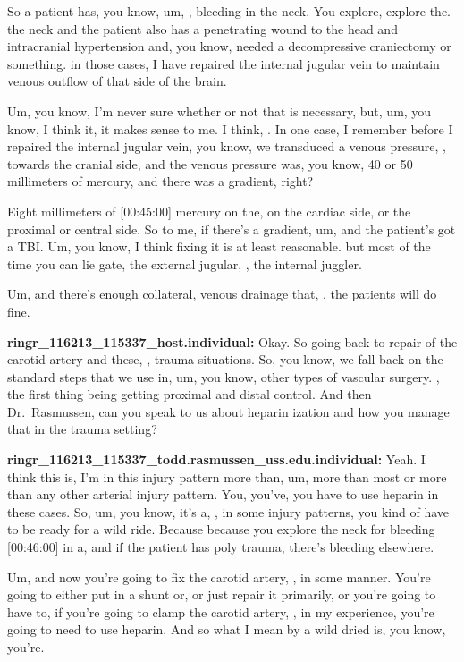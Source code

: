 \documentclass[
]{book}
\begin{document}
So a patient has, you know, um, , bleeding in the neck. You explore,
explore the. the neck and the patient also has a penetrating wound to
the head and intracranial hypertension and, you know, needed a
decompressive craniectomy or something. in those cases, I have repaired
the internal jugular vein to maintain venous outflow of that side of the
brain.

Um, you know, I'm never sure whether or not that is necessary, but, um,
you know, I think it, it makes sense to me. I think, . In one case, I
remember before I repaired the internal jugular vein, you know, we
transduced a venous pressure, , towards the cranial side, and the venous
pressure was, you know, 40 or 50 millimeters of mercury, and there was a
gradient, right?

Eight millimeters of {[}00:45:00{]} mercury on the, on the cardiac side, or
the proximal or central side. So to me, if there's a gradient, um, and
the patient's got a TBI. Um, you know, I think fixing it is at least
reasonable. but most of the time you can lie gate, the external jugular,
, the internal juggler.

Um, and there's enough collateral, venous drainage that, , the patients
will do fine.

\textbf{ringr\_116213\_115337\_host.individual:} Okay. So going back to repair
of the carotid artery and these, , trauma situations. So, you know, we
fall back on the standard steps that we use in, um, you know, other
types of vascular surgery. , the first thing being getting proximal and
distal control. And then Dr.~Rasmussen, can you speak to us about
heparin ization and how you manage that in the trauma setting?

\textbf{ringr\_116213\_115337\_todd.rasmussen\_uss.edu.individual:} Yeah. I think
this is, I'm in this injury pattern more than, um, more than most or
more than any other arterial injury pattern. You, you've, you have to
use heparin in these cases. So, um, you know, it's a, , in some injury
patterns, you kind of have to be ready for a wild ride. Because because
you explore the neck for bleeding {[}00:46:00{]} in a, and if the patient
has poly trauma, there's bleeding elsewhere.

Um, and now you're going to fix the carotid artery, , in some manner.
You're going to either put in a shunt or, or just repair it primarily,
or you're going to have to, if you're going to clamp the carotid artery,
, in my experience, you're going to need to use heparin. And so what I
mean by a wild dried is, you know, you're.
\end{document}
